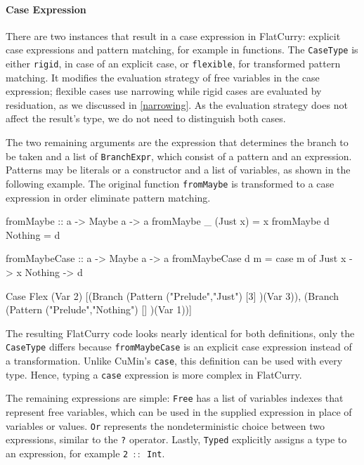 \documentclass[paper = a4, fleqn, twoside]{scrreprt}
\newcommand{\coqinline}[1]{\texttt{#1}}
\begin{document}
\paragraph{Case Expression}
There are two instances that result in a case expression in FlatCurry: explicit case expressions and pattern matching, for example in functions. The \coqinline{CaseType} is either \coqinline{rigid}, in case of an explicit case, or \coqinline{flexible}, for transformed pattern matching. It modifies the evaluation strategy of free variables in the case expression; flexible cases use narrowing while rigid cases are evaluated by residuation, as we discussed in \autoref{narrowing}. As the evaluation strategy does not affect the result's type, we do not need to distinguish both cases.
\par
The two remaining arguments are the expression that determines the branch to be taken and a list of \coqinline{BranchExpr}, which consist of a pattern and an expression. Patterns may be literals or a constructor and a list of variables, as shown in the following example. The original function \texttt{fromMaybe} is transformed to a case expression in order eliminate pattern matching.\\
\par
\begin{minipage}[t]{.45\linewidth}
\begin{haskellcode}
fromMaybe :: a -> Maybe a -> a
fromMaybe _ (Just x) = x
fromMaybe d Nothing  = d
\end{haskellcode}
\end{minipage}
\hfill
\vrule
\hspace*{.5em}
\begin{minipage}[t]{.5\linewidth}
\begin{haskellcode}
fromMaybeCase :: a -> Maybe a -> a
fromMaybeCase d m = case m of
                      Just x  -> x
                      Nothing -> d
\end{haskellcode}
\end{minipage}
\begin{coqcode}
Case Flex (Var 2) [(Branch (Pattern ("Prelude","Just") [3] )(Var 3)),
                   (Branch (Pattern ("Prelude","Nothing") [] )(Var 1))]
\end{coqcode}
The resulting FlatCurry code looks nearly identical for both definitions, only the \coqinline{CaseType} differs because \texttt{fromMaybeCase} is an explicit case expression instead of a transformation. Unlike CuMin's \texttt{case}, this definition can be used with every type. Hence, typing a \texttt{case} expression is more complex in FlatCurry.\\
\par \noindent
The remaining expressions are simple: \texttt{Free} has a list of variables indexes that represent free variables, which can be used in the supplied expression in place of variables or values. \texttt{Or} represents the nondeterministic choice between two expressions, similar to the \texttt{?} operator. Lastly, \texttt{Typed} explicitly assigns a type to an expression, for example \mbox{\texttt{2 $::$ Int}}.
\end{document}
